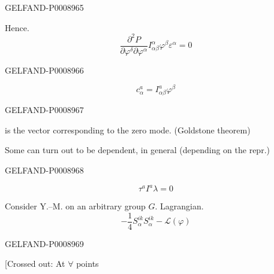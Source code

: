 \begin{GelfandAdjacentEvidence}{GELFAND-P000896}{5}


Hence.
\begin{equation*}
\frac{\partial^2 P}{\partial\varphi^\delta\partial\varphi^\alpha}
 I^\alpha_{\alpha\beta}\varphi^\beta\varepsilon^\alpha=0 \tag{22}
\end{equation*}
\end{GelfandAdjacentEvidence}
\begin{GelfandAdjacentEvidence}{GELFAND-P000896}{6}

\begin{equation*}
c^a_\alpha=I^a_{\alpha\beta}\varphi^\beta \tag{23}
\end{equation*}
\end{GelfandAdjacentEvidence}
\begin{GelfandAdjacentEvidence}{GELFAND-P000896}{7}

is the vector corresponding to the zero mode. (Goldstone theorem)

Some can turn out to be dependent, in general (depending on the repr.)
\end{GelfandAdjacentEvidence}
\begin{GelfandAdjacentEvidence}{GELFAND-P000896}{8}

\begin{equation*}
\tau^a I^a\lambda=0 \tag{24}
\end{equation*}

Consider Y.–M. on an arbitrary group $G$. Lagrangian.
\begin{equation*}
-\frac14 S_\alpha^{ik}S_\alpha^{ik}-\mathcal L(\varphi)
\tag{25}
\end{equation*}
\end{GelfandAdjacentEvidence}
\begin{GelfandAdjacentEvidence}{GELFAND-P000896}{9}


[Crossed out: At $\forall$ points 
\end{GelfandAdjacentEvidence}
